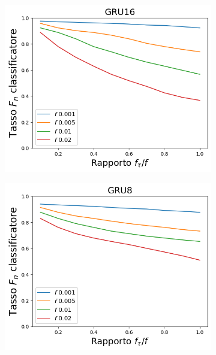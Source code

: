\documentclass[../../main.tex]{subfiles}
\begin{document}
    \begin{figure}[H]
        \centering
        \begin{subfigure}[b]{0.49\textwidth}
            \centering
            \includegraphics[width = \textwidth]{immagini/7/LBF/GRU16_FNR.png}
            \caption{}
            \label{fig:LBFFNR_GRU16}
        \end{subfigure}
        \begin{subfigure}[b]{0.49\textwidth}
            \centering
            \includegraphics[width = \textwidth]{immagini/7/LBF/GRU8_FNR.png}
            \caption{}

\end{subfigure}
\end{figure}
\end{document}
